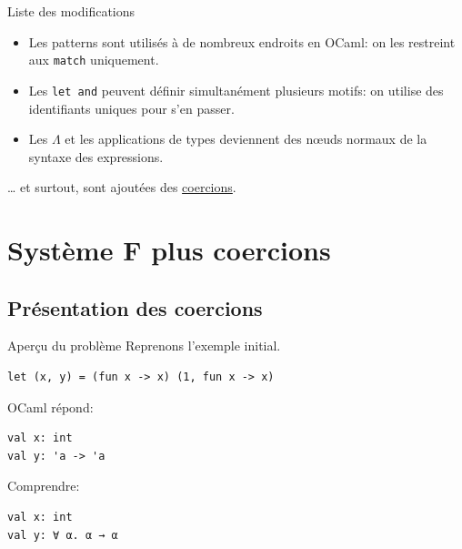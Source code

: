 \documentclass[final]{beamer}
\begin{document}
\begin{frame}{Liste des modifications}

  \begin{itemize}
    \item Les patterns sont utilisés à de nombreux endroits en OCaml: on les
      restreint aux \texttt{match} uniquement.
    \item Les \texttt{let and} peuvent définir simultanément plusieurs motifs:
      on utilise des identifiants uniques pour s'en passer.
    \item Les $\Lambda$ et les applications de types deviennent des nœuds
      normaux de la syntaxe des expressions.
  \end{itemize}
  … et surtout, sont ajoutées des \underline{coercions}.

\end{frame}

\section{Système F plus coercions}

\subsection{Présentation des coercions}

\begin{frame}[fragile]{Aperçu du problème}
Reprenons l'exemple initial.

\begin{verbatim}
let (x, y) = (fun x -> x) (1, fun x -> x)
\end{verbatim}

OCaml répond:

\begin{verbatim}
val x: int
val y: 'a -> 'a
\end{verbatim}

Comprendre:

\begin{verbatim}
val x: int
val y: ∀ α. α → α
\end{verbatim}


\end{frame}
\end{document}

